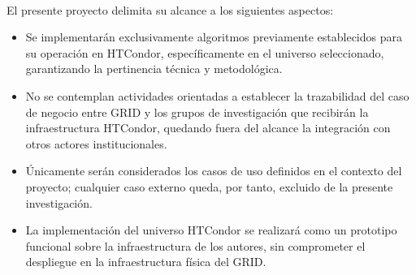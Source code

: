 \label{cap:alcance}
\mbox{}\\
\noindent
El presente proyecto delimita su alcance a los siguientes aspectos:

\begin{itemize}
	\item Se implementarán exclusivamente algoritmos previamente establecidos para su operación en HTCondor, específicamente en el universo seleccionado, garantizando la pertinencia técnica y metodológica.
	\item No se contemplan actividades orientadas a establecer la trazabilidad del caso de negocio entre GRID y los grupos de investigación que recibirán la infraestructura HTCondor, quedando fuera del alcance la integración con otros actores institucionales.
	\item Únicamente serán considerados los casos de uso definidos en el contexto del proyecto; cualquier caso externo queda, por tanto, excluido de la presente investigación.
	\item La implementación del universo HTCondor se realizará como un prototipo funcional sobre la infraestructura de los autores, sin comprometer el despliegue en la infraestructura física del GRID.
\end{itemize}
